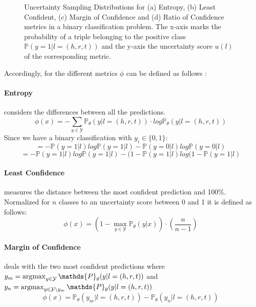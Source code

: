 \begin{figure}
\begin{minipage}{.5\textwidth}
    \end{minipage}%
    \caption{Uncertainty Sampling Distributions for (a) Entropy, (b) Least Confident, (c) Margin of Confidence and (d) Ratio of Confidence metrics in a binary classification problem.
    The x-axis marks the probability of a triple belonging to the positive class $\mathbb{P}(y = 1 | l = (h,r,t))$ and the y-axis the uncertainty score $u(l)$ of the corresponding metric.}
    \label{fig:sampling_distributions}
\end{figure}
Accordingly, for the different metrics $\phi$ can be defined as follows \cite{human-in-the-loop}:
\paragraph{\textbf{Entropy}}
considers the differences between all the predictions.
\begin{equation}
    \phi(x) = - \sum_{y \in \mathcal{Y}}{\mathds{P}_{\theta}(y | l = (h,r,t)) \cdot log \mathds{P}_{\theta}(y | l = (h,r,t) )}
\end{equation}
Since we have a binary classification with $y_i \in \{0,1\}$:
\begin{equation}
= - \mathds{P}(y = 1| l) log \mathds{P}(y = 1 | l)
- \mathds{P}(y = 0| l) log \mathds{P}(y = 0 | l)
\end{equation}
\begin{equation}
= - \mathds{P}(y = 1| l ) log \mathds{P}(y = 1 | l)
- (1 - \mathds{P}(y = 1 | l ) log(1 - \mathds{P}(y = 1 | l )
\end{equation}

\paragraph{\textbf{Least Confidence}} 
measures the distance between the most confident prediction and 100\%.
Normalized for $n$ classes to an uncertainty score between 0 and 1 it is defined as follows:
\begin{equation}
    \phi(x) = (1 - \max_{y \in \mathcal{Y}}{\mathds{P}_{\theta}(y | x)}) \cdot (\frac{n}{n-1})
\end{equation}

\paragraph{\textbf{Margin of Confidence}}
deals with the two most confident predictions where
$y_m = \argmax_{y \in \mathcal{Y}} \mathds{P}_{\theta}(y | l = (h,r,t))$ 
and $y_n = \argmax_{y \in \mathcal{Y} \setminus y_m}{\mathds{P}_{\theta}(y | l = (h,r,t))}$
\begin{equation}
    \phi(x) = \mathds{P}_{\theta}(y_m | l = (h,r,t)) - \mathds{P}_{\theta}(y_n | l = (h,r,t))
\end{equation}

